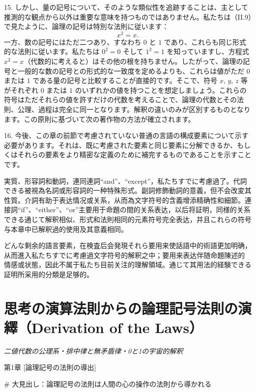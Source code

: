 \documentclass[a4paper,11pt,openany]{ltjsbook}
\begin{document}
15. しかし、量の記号について、そのような類似性を追跡することは、主として推測的な観点から以外は重要な意味を持つものではありません。私たちは（II.9）で見たように、論理の記号は特別な法則に従います：
\[
x^2 = x.
\]
一方、数の記号にはただ二つあり、すなわち $0$ と $1$ であり、これらも同じ形式的な法則に従います。私たちは $0^2 = 0$ そして $1^2 = 1$ を知っていますし、方程式 $x^2 = x$（代数的に考えると）はその他の根を持ちません。したがって、論理の記号と一般的な数の記号との形式的な一致度を定めるよりも、これらは値がただ $0$ または $1$ である量の記号と比較することが直接的です。そこで、符号 $x$, $y$, $z$ 等がそれぞれ $0$ または $1$ のいずれかの値を持つことを想定しましょう。これらの符号はただそれらの値を許すだけの代数を考えることで、論理の代数とその法則、公理、過程は完全に同一となります。解釈の違いのみが区別するものとなります。この原則に基づいて次の著作物の方法が確立されます。

16. 今後、この章の前節で考慮されていない普通の言語の構成要素について示す必要があります。それは、既に考慮された要素と同じ要素に分解できるか、もしくはそれらの要素をより精密な定義のために補完するものであることを示すことです。

実質、形容詞和動詞，連同連詞“and”、“except”，私たちすでに考慮過了。代詞できる被視為名詞或形容詞的一种特殊形式。副詞修飾動詞的意義，但不会改変其性質。介詞有助于表达情况或关系，从而為文字符号的含義增添精确性和細節。連接詞“if”、“either”、“or”主要用于命題の間的关系表达，以后将証明，同様的关系できる通じて解釈相似、形式和法則相同的元素符号完全表达，并且これらの符号与本章中已解釈過的使用及其意義相同。

どんな剩余的語言要素，在検査后会発現それら要用来使話語中的術語更加明确，从而進入私たちすでに考慮過文字符号的解釈之中；要用来表达伴随命題陳述的情感或状態，因此不属于私たち目前关注的理解領域。通じて其用法的経験できる証明所采用的分類是足够的。

\newpage

\chapter{思考の演算法則からの論理記号法則の演繹（Derivation of the Laws）}
\label{ch:iii}

\begin{center}
\large\textit{二値代数の公理系・排中律と無矛盾律・0と1の宇宙的解釈}
\end{center}
\vspace{4mm}

第1章 [論理記号の法則の導出]

\# 大見出し：論理記号の法則は人間の心の操作の法則から導かれる
\end{document}
